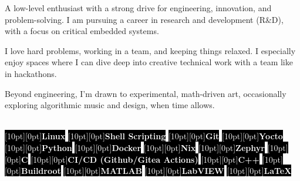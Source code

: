 \documentclass[9pt]{./src/packages/Developer_CV/developercv}
\begin{document}

\noindent %
\begin{minipage}[t]{0.60\textwidth} %
    \raggedright

    A low-level enthusiast with a strong drive for engineering,
    innovation, and problem-solving. I am pursuing a career in research and
    development (R\&D), with a focus on critical embedded systems.

    I love hard problems, working in a team, and keeping things relaxed.
    I especially enjoy spaces where I can dive deep into creative technical work
    with a team like in hackathons.

    Beyond engineering, I’m drawn to experimental, math-driven art, occasionally
    exploring algorithmic music and design, when time allows.

\end{minipage}
\hfill %
\begin{minipage}[t]{0.35\textwidth}
    \raggedright %
    \\
    \colorbox{black}{\textcolor{white}{\raisebox{0.5ex}[10pt][0pt]{\textbf{Linux}}}}
    \colorbox{black}{\textcolor{white}{\raisebox{0.5ex}[10pt][0pt]{\textbf{Shell Scripting}}}}
    \colorbox{black}{\textcolor{white}{\raisebox{0.5ex}[10pt][0pt]{\textbf{Git}}}}
    \colorbox{black}{\textcolor{white}{\raisebox{0.5ex}[10pt][0pt]{\textbf{Yocto}}}}
    \colorbox{black}{\textcolor{white}{\raisebox{0.5ex}[10pt][0pt]{\textbf{Python}}}}
    \colorbox{black}{\textcolor{white}{\raisebox{0.5ex}[10pt][0pt]{\textbf{Docker}}}}
    \colorbox{black}{\textcolor{white}{\raisebox{0.5ex}[10pt][0pt]{\textbf{Nix}}}}
    \colorbox{black}{\textcolor{white}{\raisebox{0.5ex}[10pt][0pt]{\textbf{Zephyr}}}}
    \colorbox{black}{\textcolor{white}{\raisebox{0.5ex}[10pt][0pt]{\textbf{C}}}}
    \colorbox{black}{\textcolor{white}{\raisebox{0.5ex}[10pt][0pt]{\textbf{CI/CD (Github/Gitea Actions)}}}}
    \colorbox{black}{\textcolor{white}{\raisebox{0.5ex}[10pt][0pt]{\textbf{C++}}}}
    \colorbox{black}{\textcolor{white}{\raisebox{0.5ex}[10pt][0pt]{\textbf{Buildroot}}}}
    \colorbox{black}{\textcolor{white}{\raisebox{0.5ex}[10pt][0pt]{\textbf{MATLAB}}}}
    \colorbox{black}{\textcolor{white}{\raisebox{0.5ex}[10pt][0pt]{\textbf{LabVIEW}}}}
    \colorbox{black}{\textcolor{white}{\raisebox{0.5ex}[10pt][0pt]{\textbf{LaTeX}}}}
    \\
\end{minipage}
\end{document}

